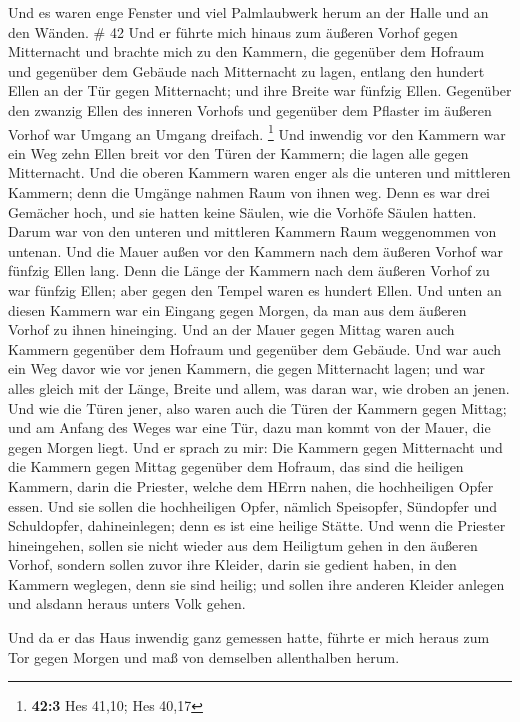  Und es waren enge Fenster und viel Palmlaubwerk herum an
der Halle und an den Wänden. \# 42  Und er führte mich
hinaus zum äußeren Vorhof gegen Mitternacht und brachte mich zu den
Kammern, die gegenüber dem Hofraum und gegenüber dem Gebäude nach
Mitternacht zu lagen,  entlang den hundert Ellen an der Tür
gegen Mitternacht; und ihre Breite war fünfzig Ellen. 
Gegenüber den zwanzig Ellen des inneren Vorhofs und gegenüber dem
Pflaster im äußeren Vorhof war Umgang an Umgang dreifach. \footnote{\textbf{42:3}
  Hes 41,10; Hes 40,17}  Und inwendig vor den Kammern war
ein Weg zehn Ellen breit vor den Türen der Kammern; die lagen alle gegen
Mitternacht.  Und die oberen Kammern waren enger als die
unteren und mittleren Kammern; denn die Umgänge nahmen Raum von ihnen
weg.  Denn es war drei Gemächer hoch, und sie hatten keine
Säulen, wie die Vorhöfe Säulen hatten. Darum war von den unteren und
mittleren Kammern Raum weggenommen von untenan.  Und die
Mauer außen vor den Kammern nach dem äußeren Vorhof war fünfzig Ellen
lang.  Denn die Länge der Kammern nach dem äußeren Vorhof zu
war fünfzig Ellen; aber gegen den Tempel waren es hundert Ellen.
 Und unten an diesen Kammern war ein Eingang gegen Morgen,
da man aus dem äußeren Vorhof zu ihnen hineinging.  Und an
der Mauer gegen Mittag waren auch Kammern gegenüber dem Hofraum und
gegenüber dem Gebäude.  Und war auch ein Weg davor wie vor
jenen Kammern, die gegen Mitternacht lagen; und war alles gleich mit der
Länge, Breite und allem, was daran war, wie droben an jenen.
 Und wie die Türen jener, also waren auch die Türen der
Kammern gegen Mittag; und am Anfang des Weges war eine Tür, dazu man
kommt von der Mauer, die gegen Morgen liegt.  Und er sprach
zu mir: Die Kammern gegen Mitternacht und die Kammern gegen Mittag
gegenüber dem Hofraum, das sind die heiligen Kammern, darin die
Priester, welche dem HErrn nahen, die hochheiligen Opfer essen. Und sie
sollen die hochheiligen Opfer, nämlich Speisopfer, Sündopfer und
Schuldopfer, dahineinlegen; denn es ist eine heilige Stätte.
 Und wenn die Priester hineingehen, sollen sie nicht wieder
aus dem Heiligtum gehen in den äußeren Vorhof, sondern sollen zuvor ihre
Kleider, darin sie gedient haben, in den Kammern weglegen, denn sie sind
heilig; und sollen ihre anderen Kleider anlegen und alsdann heraus
unters Volk gehen.

 Und da er das Haus inwendig ganz gemessen hatte, führte er
mich heraus zum Tor gegen Morgen und maß von demselben allenthalben
herum.

